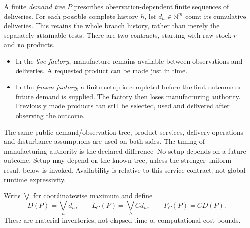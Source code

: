 \documentclass[11pt]{article}
\theoremstyle{definition}
\theoremstyle{remark}
\begin{document}
A finite \emph{demand tree} $P$ prescribes observation-dependent finite
sequences of deliveries. For each possible complete history $h$, let
$d_h\in\mathbb N^m$ count its cumulative deliveries. This retains the
whole branch history, rather than merely the separately attainable tests.
There are two contracts, starting with raw stock $r$ and no products.
\begin{itemize}
\item In the \emph{live factory}, manufacture remains available between
observations and deliveries. A requested product can be made just in time.
\item In the \emph{frozen factory}, a finite setup is completed before the
first outcome or future demand is supplied. The factory then loses
manufacturing authority. Previously made products can still be selected,
used and delivered after observing the outcome.
\end{itemize}
The same public demand/observation tree, product services, delivery
operations and disturbance assumptions are used on both sides. The timing
of manufacturing authority is the declared difference. No setup depends
on a future outcome. Setup may depend on the known tree, unless the
stronger uniform result below is invoked. Availability is relative to
this service contract, not global runtime expressivity.

Write $\bigvee$ for coordinatewise maximum and define
\[
 D(P)=\bigvee_h d_h,\qquad
 L_C(P)=\bigvee_h Cd_h,\qquad
 F_C(P)=C D(P).
\]
These are material inventories, not elapsed-time or computational-cost
bounds.
\end{document}
